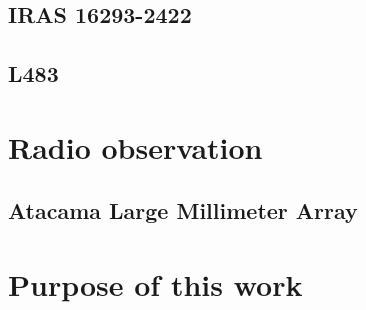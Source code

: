 \subsection{IRAS 16293-2422}
\subsection{L483}

\section{Radio observation}
\subsection{Atacama Large Millimeter Array}

\section{Purpose of this work}